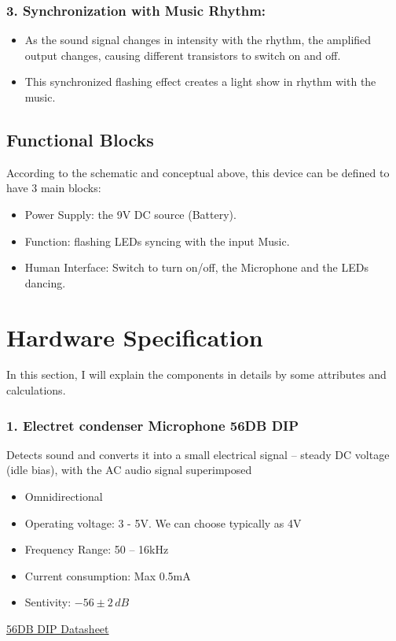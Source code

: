 \documentclass[a4paper]{article}
\numberwithin{figure}{section}
\begin{document}
\subsubsection*{3. Synchronization with Music Rhythm:}
\begin{itemize}
    \item As the sound signal changes in intensity with the rhythm, the amplified output changes, causing different transistors to switch on and off.
    \item This synchronized flashing effect creates a light show in rhythm with the music.
\end{itemize}

\subsection{Functional Blocks}
According to the schematic and conceptual above, this device can be defined to have 3 main blocks:
\begin{itemize}
    \item Power Supply: the 9V DC source (Battery).
    \item Function: flashing LEDs syncing with the input Music.
    \item Human Interface: Switch to turn on/off, the Microphone and the LEDs dancing.
\end{itemize}
\section{Hardware Specification}
In this section, I will explain the components in details by some attributes and calculations.
\subsubsection*{1. Electret condenser Microphone 56DB DIP}
Detects sound and converts it into a small electrical signal – steady DC voltage (idle bias), with the AC audio signal superimposed
\begin{itemize}
    \item Omnidirectional
    \item Operating voltage: 3 - 5V. We can choose typically as 4V
    \item Frequency Range: 50 – 16kHz
    \item Current consumption: Max 0.5mA 
    \item Sentivity: $-56\pm2\, dB$
\end{itemize}
\href{https://banlinhkien.com/cam-bien-am-thanh-mic-9x7mm-56db-dip-p6650694.html}{56DB DIP Datasheet}
\end{document}
